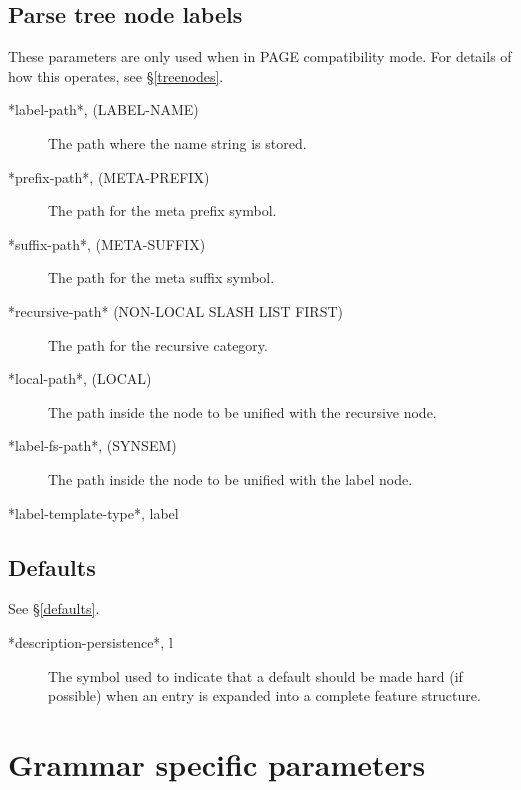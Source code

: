 \documentclass[12pt]{report}
\begin{document}
\subsection{Parse tree node labels}
\label{ptreeglob}
These parameters are only used when in PAGE compatibility mode.  For details
of how this operates, see \S\ref{treenodes}.
\begin{description}
\item[*label-path*, (LABEL-NAME)]
The path where the name string is stored.
\item[*prefix-path*, (META-PREFIX)]
The path for the meta prefix symbol.
\item[ *suffix-path*, (META-SUFFIX)]
The path for the meta suffix symbol.
\item[ *recursive-path* (NON-LOCAL SLASH LIST FIRST)]
The path for the recursive category.
\item[*local-path*, (LOCAL)]
The path inside the node to be unified with the recursive node.
\item[ *label-fs-path*, (SYNSEM)]
The path inside the node to be unified with the label node.
\item[*label-template-type*, label]
\end{description}

\subsection{Defaults}
\label{defglob}
See \S\ref{defaults}.
\begin{description}
\item[ *description-persistence*, l]
The symbol used to indicate that a default should be
made hard (if possible) when an entry is expanded into a complete
feature structure.
\end{description}

\section{Grammar specific parameters}
\label{gramglob}
\end{document}
